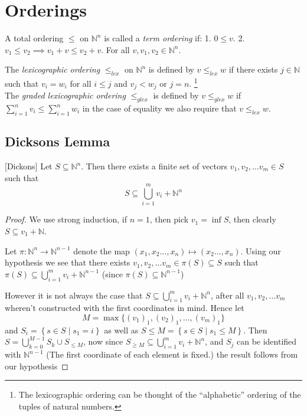 \section{Orderings}
\begin{definition}\label{def:term_ordering}
A total ordering $\leq$ on $\mathbb{N}^{n}$ is called a \textit{term ordering} if:
1. $0 \leq v$.
2. $v_1 \leq v_2 \implies v_1 + v \leq v_2 + v$.
For all $v, v_1,v_2 \in \mathbb{N}^{n}$.
\end{definition}
\begin{example}\label{exmp:lexigraphic_orderings}
 The \textit{lexicographic ordering} $\leq_{lex}$ on $\mathbb{N}^{n}$ is defined by $v \leq_{lex} w$ if there exists $j \in \mathbb{N}$ such that $v_i = w_i$ for all $i \leq j$ and $v_j < w_j$ or $j = n$. \footnote{The lexicographic ordering can be thought of the ``alphabetic'' ordering of the tuples of natural numbers.} \\

The \textit{graded lexicographic ordering} $\leq_{glex}$ is defined by $v \leq_{glex} w$ if $\sum_{i = 1}^n v_i \leq \sum_{i = 1}^n w_{i}$ in the case of equality we also require that $v \leq_{lex} w$.
\end{example}
\subsection{Dicksons Lemma}
\begin{lemma}\label{lem:dicksons}[Dickons]
Let $S \subseteq \mathbb{N}^{n}$. Then there exists a finite set of vectors $v_1, v_2, \ldots v_m \in S$ such that
\begin{equation*}
    S \subseteq \bigcup_{i = 1}^m v_i + \mathbb{N}^{n}
\end{equation*}
\end{lemma}

\begin{proof}
We use strong induction, if $n = 1$, then pick $v_1 = \inf S$, then clearly $S \subseteq v_1 + \mathbb{N}$.

Let $\pi: \mathbb{N}^n \to \mathbb{N}^{n - 1}$ denote the map $(x_1, x_2 \ldots, x_{n}) \mapsto (x_2 \ldots, x_{n})$. Using our hypothesis we see that there exists $v_1, v_2, \ldots v_m \in \pi(S) \subseteq S$ such that $\pi(S) \subseteq \bigcup_{i = 1}^m v_i + \mathbb{N}^{n - 1}$ (since $\pi(S) \subseteq \mathbb{N}^{n - 1}$)

However it is not always the case that $S \subseteq \bigcup_{i = 1}^m v_i + \mathbb{N}^{n}$, after all $v_1, v_2, \ldots v_m$ wheren't constructed with the first coordinates in mind. Hence let
\begin{equation*}
 M = \max\{(v_{1})_{1}, (v_2)_1, \ldots, (v_m)_1\}
\end{equation*}
and $S_i = \left\{s \in S \middle| s_1 = i \right\}$ as well as $S \leq M = \left\{s \in S \middle| s_1 \leq M\right\}$. Then $S = \bigcup_{k = 0}^{M - 1} S_{k} \cup S_{\leq M}$, now since $S_{\geq M} \subseteq \bigcup_{i = 1}^m v_i + \mathbb{N}^{n}$, and $S_j$ can be identified with $\mathbb{N}^{n - 1}$ (The first coordinate of each element is fixed.) the result follows from our hypothesis
\end{proof}

